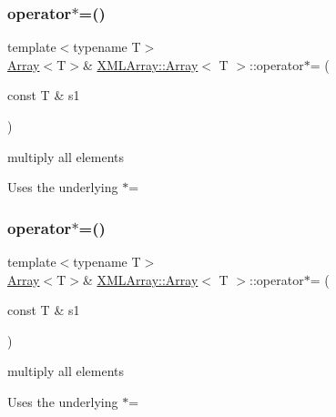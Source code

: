 \subsubsection{\texorpdfstring{operator$\ast$=()}{operator*=()}\hspace{0.1cm}{\footnotesize\ttfamily [3/4]}}
{\footnotesize\ttfamily template$<$typename T$>$ \\
\mbox{\hyperlink{classXMLArray_1_1Array}{Array}}$<$T$>$\& \mbox{\hyperlink{classXMLArray_1_1Array}{X\+M\+L\+Array\+::\+Array}}$<$ T $>$\+::operator$\ast$= (\begin{DoxyParamCaption}\item[{const T \&}]{s1 }\end{DoxyParamCaption})\hspace{0.3cm}{\ttfamily [inline]}}



multiply all elements 

Uses the underlying $\ast$= \mbox{\label{classXMLArray_1_1Array_a4afa4c469f84b40f88c27273602528cc}} 
\subsubsection{\texorpdfstring{operator$\ast$=()}{operator*=()}\hspace{0.1cm}{\footnotesize\ttfamily [4/4]}}
{\footnotesize\ttfamily template$<$typename T$>$ \\
\mbox{\hyperlink{classXMLArray_1_1Array}{Array}}$<$T$>$\& \mbox{\hyperlink{classXMLArray_1_1Array}{X\+M\+L\+Array\+::\+Array}}$<$ T $>$\+::operator$\ast$= (\begin{DoxyParamCaption}\item[{const T \&}]{s1 }\end{DoxyParamCaption})\hspace{0.3cm}{\ttfamily [inline]}}



multiply all elements 

Uses the underlying $\ast$= \mbox{\label{classXMLArray_1_1Array_ab8a6046aa7dbc0b3c43e4479b1eaf004}} 
